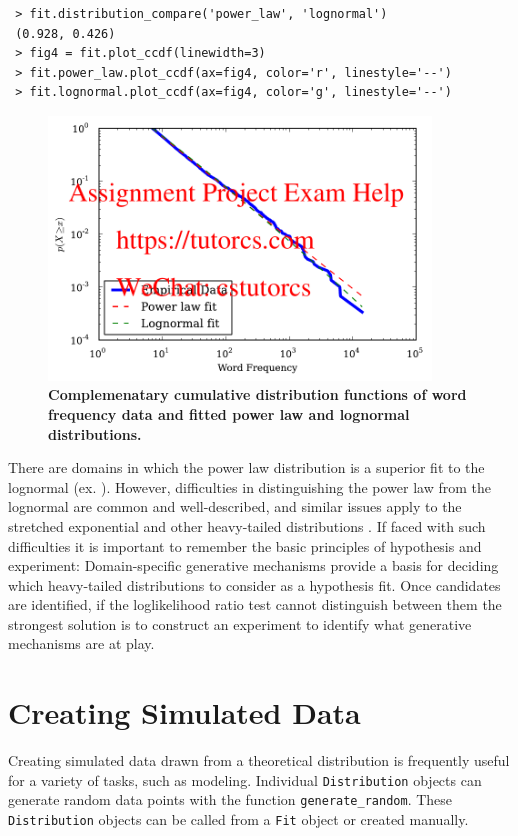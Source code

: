 \documentclass[10pt]{article}
\begin{document}
 \begin{verbatim}
 > fit.distribution_compare('power_law', 'lognormal')
 (0.928, 0.426)
 > fig4 = fit.plot_ccdf(linewidth=3)
 > fit.power_law.plot_ccdf(ax=fig4, color='r', linestyle='--')
 > fit.lognormal.plot_ccdf(ax=fig4, color='g', linestyle='--')
 \end{verbatim}
 
\begin{figure}[!ht]
\begin{center}
\includegraphics[width=4in]{FigLognormal.pdf}
\end{center}
\caption{
{\bf Complemenatary cumulative distribution functions of word frequency data and fitted power law and lognormal distributions.}
}
\label{Lognormal}
\end{figure}

 There are domains in which the power law distribution is a superior fit to the lognormal (ex. \cite{Klaus2011}). However, difficulties in distinguishing the power law from the lognormal are common and well-described, and similar issues apply to the stretched exponential and other heavy-tailed distributions \cite{Malevergne2009, Malevergne2005,Mitzenmacher2004}. If faced with such difficulties it is important to remember the basic principles of hypothesis and experiment: Domain-specific generative mechanisms provide a basis for deciding which heavy-tailed distributions to consider as a hypothesis fit. Once candidates are identified, if the loglikelihood ratio test cannot distinguish between them the strongest solution is to construct an experiment to identify what generative mechanisms are at play. 
 
 \section*{Creating Simulated Data}
 Creating simulated data drawn from a theoretical distribution is frequently useful for a variety of tasks, such as modeling. Individual \verb$Distribution$ objects can generate random data points with the function \verb$generate_random$. These \verb$Distribution$ objects can be called from a \verb$Fit$ object or created manually.
 
\end{document}

